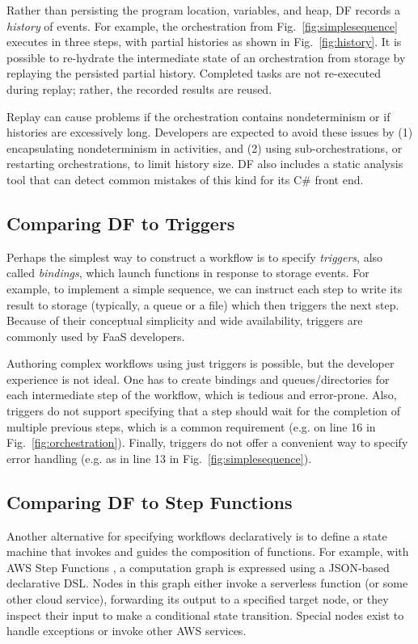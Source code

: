 Rather than persisting the program location, variables, and heap, DF records a \emph{history} of events. For example, the orchestration from Fig.~\ref{fig:simplesequence} executes in three steps, with partial histories as shown in Fig.~\ref{fig:history}. It is possible to re-hydrate the intermediate state of an orchestration from storage by replaying the persisted partial history. Completed tasks are not re-executed during replay; rather, the recorded results are reused.

Replay can cause problems if the orchestration contains nondeterminism or if histories are excessively long. Developers are expected to avoid these issues by (1) encapsulating  nondeterminism in activities, and (2) using sub-orchestrations, or restarting orchestrations, to limit history size. DF also includes a static analysis tool that can detect common mistakes of this kind for its C\# front end.

\subsection{Comparing DF to Triggers}

Perhaps the simplest way to construct a workflow is to specify \emph{triggers}, also called \emph{bindings}, which launch functions in response to storage events. For example, to implement a simple sequence, we can instruct each step to write its result to storage (typically, a queue or a file) which then triggers the next step. Because of their conceptual simplicity and wide availability, triggers are commonly used by FaaS developers. 

Authoring complex workflows using just triggers is possible, but the developer experience is not ideal. One has to create bindings and queues/directories for each intermediate step of the workflow, which is tedious and error-prone. Also, triggers do not support specifying that a step should wait for the completion of multiple previous steps, which is a common requirement (e.g. on line 16 in Fig.~\ref{fig:orchestration}). Finally, triggers do not offer a convenient way to specify error handling (e.g. as in line 13 in Fig.~\ref{fig:simplesequence}).

\subsection{Comparing DF to Step Functions}
%
%
Another alternative for specifying workflows declaratively is to define a state machine that invokes and guides the composition of functions. For example, with AWS Step Functions \cite{aws-step-functions}, a computation graph is expressed using a JSON-based declarative DSL. Nodes in this graph either invoke a serverless function (or some other cloud service), forwarding its output to a specified target node, or they inspect their input to make a conditional state transition. Special nodes exist to handle exceptions or invoke other AWS services.

